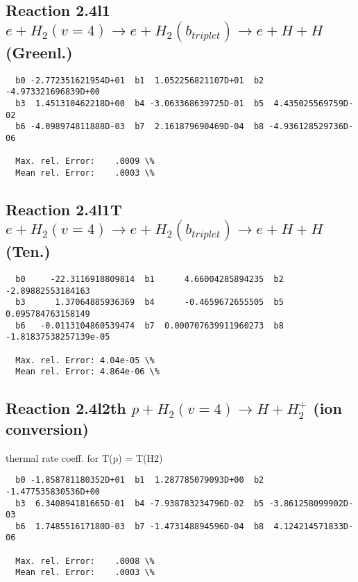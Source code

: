 \documentclass[12pt,dvipdfmx]{article}
\begin{document}
\newpage

\subsection{
Reaction 2.4l1
$ e + H_2(v=4) \rightarrow e + H_2(b_{triplet})\rightarrow e + H + H $ (Greenl.)
}


\begin{small}\begin{verbatim}
  b0 -2.772351621954D+01  b1  1.052256821107D+01  b2 -4.973321696839D+00
  b3  1.451310462218D+00  b4 -3.063368639725D-01  b5  4.435025569759D-02
  b6 -4.098974811888D-03  b7  2.161879690469D-04  b8 -4.936128529736D-06

  Max. rel. Error:    .0009 \%
  Mean rel. Error:    .0003 \%

\end{verbatim}\end{small}



\subsection{
Reaction 2.4l1T
$  e + H_2(v=4) \rightarrow e + H_2(b_{triplet})\rightarrow e + H + H $ (Ten.)
}


\begin{small}\begin{verbatim}
  b0     -22.3116918809814  b1      4.66004285894235  b2     -2.89882553184163
  b3      1.37064885936369  b4      -0.4659672655505  b5     0.095784763158149
  b6   -0.0113104860539474  b7  0.000707639911960273  b8 -1.81837538257139e-05

  Max. rel. Error: 4.04e-05 \%
  Mean rel. Error: 4.864e-06 \%
\end{verbatim}\end{small}


\subsection{
Reaction 2.4l2th
$ p + H_2(v=4) \rightarrow H + H_2^+$ (ion conversion)
}
thermal rate coeff. for T(p) = T(H2)

\begin{small}\begin{verbatim}
  b0 -1.858781180352D+01  b1  1.287785079093D+00  b2 -1.477535830536D+00
  b3  6.340894181665D-01  b4 -7.938783234796D-02  b5 -3.861258099902D-03
  b6  1.748551617180D-03  b7 -1.473148894596D-04  b8  4.124214571833D-06

  Max. rel. Error:    .0008 \%
  Mean rel. Error:    .0003 \%

\end{verbatim}\end{small}
\end{document}
